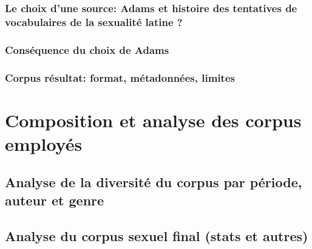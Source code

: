 \subsubsection{Le choix d’une source: Adams et histoire des tentatives de vocabulaires de la sexualité latine ?} 


\subsubsection{Conséquence du choix de Adams}



\subsubsection{Corpus résultat: format, métadonnées, limites}



\section{Composition et analyse des corpus employés}

\subsection{Analyse de la diversité du corpus par période, auteur et genre}


\subsection{Analyse du corpus sexuel final (stats et autres)}
